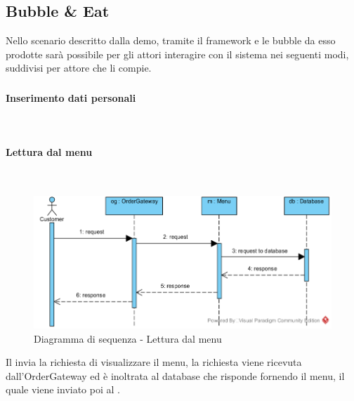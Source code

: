 \subsection{Bubble \& Eat}
Nello scenario descritto dalla demo, tramite il framework e le bubble da esso prodotte sarà possibile per gli attori interagire con il sistema nei seguenti modi, suddivisi per attore che li compie.

\subsubsection{\Customer{}}
\begin{samepage}
\paragraph{Inserimento dati personali}\mbox{}\\
\end{samepage}

\begin{samepage}
\paragraph{Lettura dal menu}\mbox{}\\
\end{samepage}
\begin{figure}[H]
	\centering
	\includegraphics[width=14cm]{../../documenti/SpecificaTecnica/diagrammi_img/sequenza/client_visualizza_menu.png}
	\caption{Diagramma di sequenza - Lettura dal menu}
\end{figure}
Il \Customer{} invia la richiesta di visualizzare il menu, la richiesta viene ricevuta dall'Order\-Gateway ed è inoltrata al database che risponde fornendo il menu, il quale viene inviato poi al \Customer{}.

